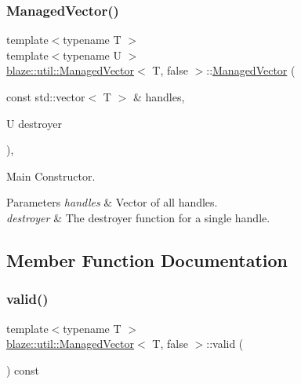 \subsubsection{\texorpdfstring{Managed\+Vector()}{ManagedVector()}}
{\footnotesize\ttfamily template$<$typename T $>$ \\
template$<$typename U $>$ \\
\hyperlink{classblaze_1_1util_1_1ManagedVector}{blaze\+::util\+::\+Managed\+Vector}$<$ T, false $>$\+::\hyperlink{classblaze_1_1util_1_1ManagedVector}{Managed\+Vector} (\begin{DoxyParamCaption}\item[{const std\+::vector$<$ T $>$ \&}]{handles,  }\item[{U}]{destroyer }\end{DoxyParamCaption})\hspace{0.3cm}{\ttfamily [inline]}, {\ttfamily [noexcept]}}



Main Constructor. 


\begin{DoxyParams}{Parameters}
{\em handles} & Vector of all handles. \\
\hline
{\em destroyer} & The destroyer function for a single handle. \\
\hline
\end{DoxyParams}


\subsection{Member Function Documentation}
\mbox{\label{classblaze_1_1util_1_1ManagedVector_3_01T_00_01false_01_4_a35ba5f24d9828ad6ff77da7593780290}} 
\subsubsection{\texorpdfstring{valid()}{valid()}}
{\footnotesize\ttfamily template$<$typename T $>$ \\
\hyperlink{classblaze_1_1util_1_1ManagedVector}{blaze\+::util\+::\+Managed\+Vector}$<$ T, false $>$\+::valid (\begin{DoxyParamCaption}{ }\end{DoxyParamCaption}) const\hspace{0.3cm}{\ttfamily [inline]}}



